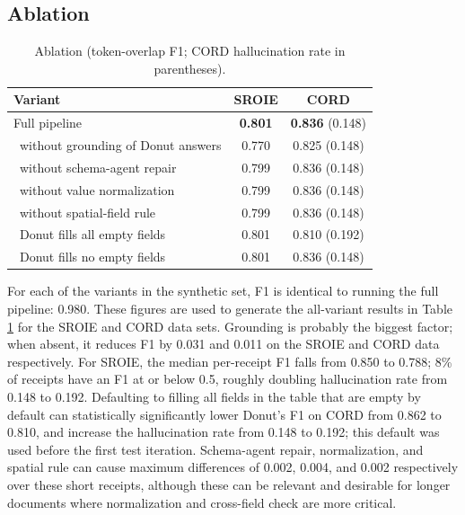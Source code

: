 \documentclass[conference]{IEEEtran}
\begin{document}
\subsection{Ablation}

\begin{table}[t]
\centering
\caption{Ablation (token-overlap F1; CORD hallucination rate in parentheses).}
\label{tab:ablation}
\footnotesize
\begin{tabular}{lcc}
\toprule
\textbf{Variant} & SROIE & CORD \\
\midrule
Full pipeline                              & \textbf{0.801} & \textbf{0.836} (0.148) \\
\ without grounding of Donut answers       & 0.770 & 0.825 (0.148) \\
\ without schema-agent repair              & 0.799 & 0.836 (0.148) \\
\ without value normalization              & 0.799 & 0.836 (0.148) \\
\ without spatial-field rule               & 0.799 & 0.836 (0.148) \\
\ Donut fills all empty fields             & 0.801 & 0.810 (0.192) \\
\ Donut fills no empty fields              & 0.801 & 0.836 (0.148) \\
\bottomrule
\end{tabular}
\end{table}

For each of the variants in the synthetic set, F1 is identical to running the full pipeline: 0.980. These figures are used to generate the all-variant results in Table \ref{tab:ablation} for the SROIE and CORD data sets. Grounding is probably the biggest factor; when absent, it reduces F1 by 0.031 and 0.011 on the SROIE and CORD data respectively. For SROIE, the median per-receipt F1 falls from 0.850 to 0.788; 8\% of receipts have an F1 at or below 0.5, roughly doubling hallucination rate from 0.148 to 0.192. Defaulting to filling all fields in the table that are empty by default can statistically significantly lower Donut's F1 on CORD from 0.862 to 0.810, and increase the hallucination rate from 0.148 to 0.192; this default was used before the first test iteration. Schema-agent repair, normalization, and spatial rule can cause maximum differences of 0.002, 0.004, and 0.002 respectively over these short receipts, although these can be relevant and desirable for longer documents where normalization and cross-field check are more critical.
\end{document}
